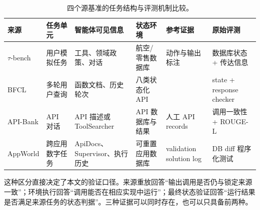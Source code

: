 \begin{table}[t]
  \centering
  \caption{四个源基准的任务结构与评测机制比较。}
  \label{tab:source-characteristics}
  \scriptsize
  \begin{tabularx}{\textwidth}{L{1.4cm}L{1.6cm}L{1.8cm}L{1.6cm}L{1.8cm}Y}
    \toprule
    来源 & 任务单元 & 智能体可见信息 & 状态环境 & 参考证据 & 原始评测 \\
    \midrule
    $\tau$-bench & 用户模拟任务 & 工具、领域政策、对话 & 航空/零售数据库 & 动作与输出标注 & 数据库状态 + 传达信息 \\
    BFCL & 多轮用户查询 & 函数文档、历史轮次 & 八类状态化 API &  & state + response checker \\
    API-Bank & API 对话 & API 描述或 ToolSearcher & API 数据库与结果 & 人工 API records & 调用一致性 + ROUGE-L \\
    AppWorld & 跨应用数字任务 & ApiDocs、Supervisor、执行历史 & 可重置应用数据库 & validation solution log & DB diff 程序化测试 \\
    \bottomrule
  \end{tabularx}
\end{table}

这种区分直接决定了本文的验证口径。来源重放回答“输出调用是否仍与锁定来源一致”；环境执行回答“调用能否在相应实现中运行”；最终状态验证回答“运行结果是否满足来源任务的状态判据”。三种证据可以同时存在，也可以只具备前两种。

